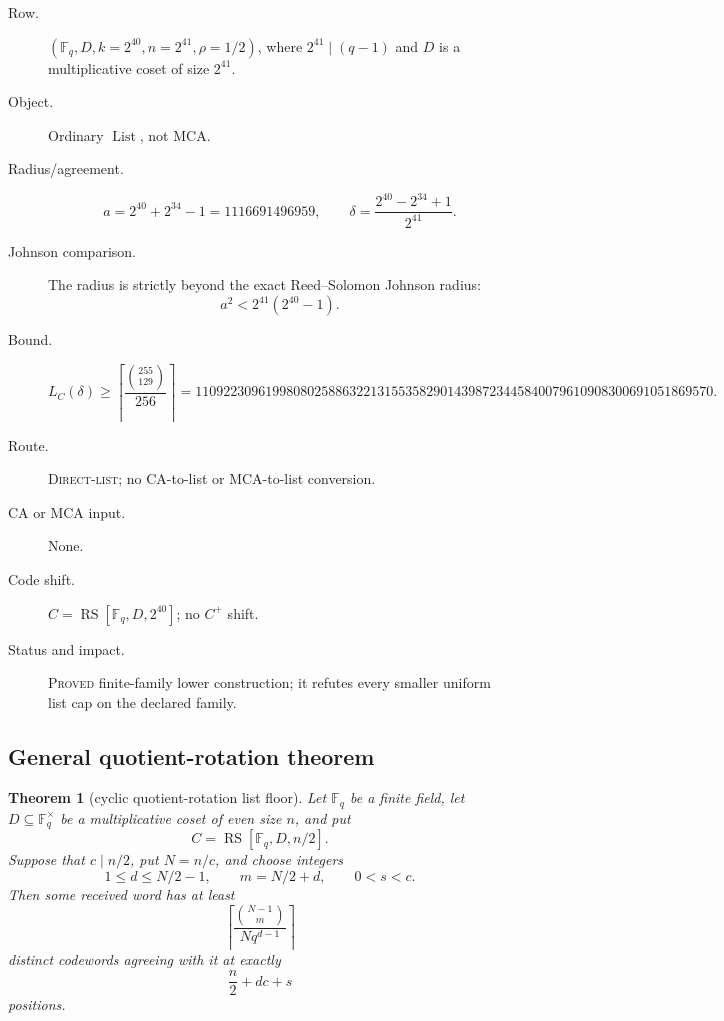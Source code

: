 \documentclass[11pt]{article}
\newtheorem{theorem}{Theorem}
\newcommand{\F}{\mathbb F}
\newcommand{\RS}{\operatorname{RS}}
\newcommand{\List}{\operatorname{List}}
\begin{document}
\begin{description}
\item[Row.]
  \((\F_q,D,k=2^{40},n=2^{41},\rho=1/2)\), where
  \(2^{41}\mid(q-1)\) and \(D\) is a multiplicative coset of size \(2^{41}\).
\item[Object.] Ordinary \(\List\), not MCA.
\item[Radius/agreement.]
  \[
    a=2^{40}+2^{34}-1=1116691496959,
    \qquad
    \delta=\frac{2^{40}-2^{34}+1}{2^{41}}.
  \]
\item[Johnson comparison.]
  The radius is strictly beyond the exact Reed--Solomon Johnson radius:
  \[
    a^2<2^{41}(2^{40}-1).
  \]
\item[Bound.]
  \[
  L_C(\delta)\ge
  \left\lceil\frac{\binom{255}{129}}{256}\right\rceil
  =
  11092230961998080258863221315535829014398723445840079610908300691051869570.
  \]
\item[Route.] \textsc{Direct-list}; no CA-to-list or MCA-to-list conversion.
\item[CA or MCA input.] None.
\item[Code shift.] \(C=\RS[\F_q,D,2^{40}]\); no \(C^+\) shift.
\item[Status and impact.] \textsc{Proved} finite-family lower construction;
  it refutes every smaller uniform list cap on the declared family.
\end{description}

\subsection{General quotient-rotation theorem}

\begin{theorem}[cyclic quotient-rotation list floor]
\label{thm:rate-half-cyclic-quotient-rotation-floor}
Let \(\F_q\) be a finite field, let \(D\subseteq\F_q^\times\) be a
multiplicative coset of even size \(n\), and put
\[
  C=\RS[\F_q,D,n/2].
\]
Suppose that \(c\mid n/2\), put \(N=n/c\), and choose integers
\[
  1\le d\le N/2-1,
  \qquad
  m=N/2+d,
  \qquad
  0<s<c.
\]
Then some received word has at least
\begin{equation}
\label{eq:rate-half-list-floor}
  \left\lceil
    \frac{\binom{N-1}{m}}{Nq^{d-1}}
  \right\rceil
\end{equation}
distinct codewords agreeing with it at exactly
\begin{equation}
\label{eq:rate-half-exact-agreement}
  \frac n2+dc+s
\end{equation}
positions.
\end{theorem}
\end{document}
